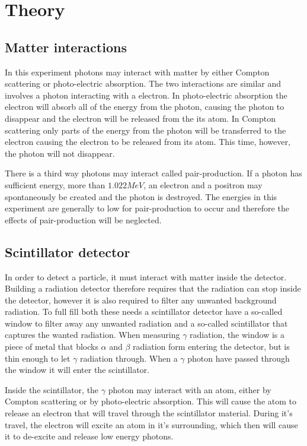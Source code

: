 \documentclass[12pt]{report}
\begin{document}
\chapter{Theory}

\section{Matter interactions}
In this experiment photons may interact with matter by either Compton scattering or photo-electric absorption. The two interactions are similar and involves a photon interacting with a electron. In photo-electric absorption the electron will absorb all of the energy from the photon, causing the photon to disappear and the electron will be released from the its atom. In Compton scattering only parts of the energy from the photon will be transferred to the electron causing the electron to be released from its atom. This time, however, the photon will not disappear.

There is a third way photons may interact called pair-production. If a photon has sufficient energy, more than $1.022MeV$, an electron and a positron may spontaneously be created and the photon is destroyed. The energies in this experiment are generally to low for pair-production to occur and therefore the effects of pair-production will be neglected.

\section{Scintillator detector}
In order to detect a particle, it must interact with matter inside the detector. Building a radiation detector therefore requires that the radiation can stop inside the detector, however it is also required to filter any unwanted background radiation. To full fill both these needs a scintillator detector have a so-called window to filter away any unwanted radiation and a so-called scintillator that captures the wanted radiation. When measuring $\gamma$ radiation, the window is a piece of metal that blocks $\alpha$ and $\beta$ radiation form entering the detector, but is thin enough to let $\gamma$ radiation through. When a $\gamma$ photon have passed through the window it will enter the scintillator.

Inside the scintillator, the $\gamma$ photon may interact with an atom, either by Compton scattering or by photo-electric absorption. This will cause the atom to release an electron that will travel through the scintillator material. During it’s travel, the electron will excite an atom in it’s surrounding, which then will cause it to de-excite and release low energy photons.
\end{document}
